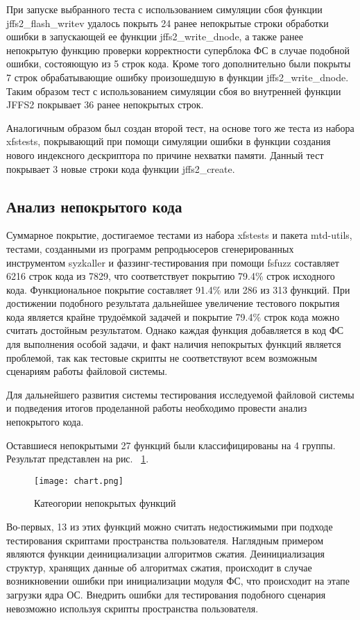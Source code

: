 При запуске выбранного теста с использованием симуляции сбоя функции jffs2\_flash\_writev удалось покрыть 24 ранее непокрытые строки обработки ошибки в запускающей ее функции jffs2\_write\_dnode, а также ранее непокрытую функцию проверки корректности суперблока ФС в случае подобной ошибки, состояющую из 5 строк кода. Кроме того дополнительно были покрыты 7 строк обрабатывающие ошибку произошедшую в функции jffs2\_write\_dnode. Таким образом тест с использованием симуляции сбоя во внутренней функции JFFS2 покрывает 36 ранее непокрытых строк.

Аналогичным образом был создан второй тест, на основе того же теста из набора xfstests, покрывающий при помощи симуляции ошибки в функции создания нового индексного дескриптора по причине нехватки памяти. Данный тест покрывает 3 новые строки кода функции jffs2\_create.

\subsection{Анализ непокрытого кода}

Суммарное покрытие, достигаемое тестами из набора xfstests и пакета mtd-utils, тестами, созданными из программ репродьюсеров сгенерированных инструментом syzkaller и фаззинг-тестирования при помощи fsfuzz составляет 6216 строк кода из 7829, что соответствует покрытию 79.4\% строк исходного кода. Функциональное покрытие составляет 91.4\% или 286 из 313 функций. При достижении подобного результата дальнейшее увеличение тестового покрытия кода является крайне трудоёмкой задачей и покрытие 79.4\% строк кода можно считать достойным результатом. Однако каждая функция добавляется в код ФС для выполнения особой задачи, и факт наличия непокрытых функций является проблемой, так как тестовые скрипты не соответствуют всем возможным сценариям работы файловой системы.

Для дальнейшего развития системы тестирования исследуемой файловой системы и подведения итогов проделанной работы необходимо провести анализ непокрытого кода.

Оставшиеся непокрытыми 27 функций были классифицированы на 4 группы. Результат представлен на рис. ~\ref{funcs}.

\begin{figure}[H]
	\centering
	\texttt{[image: chart.png]}
	\caption{Катеогории непокрытых функций}
	\label{funcs}
\end{figure}

Во-первых, 13 из этих функций можно считать недостижимыми при подходе тестирования скриптами пространства пользователя. Наглядным примером являются функции деинициализации алгоритмов сжатия. Деинициализация структур, хранящих данные об алгоритмах сжатия, происходит в случае возникновении ошибки при инициализации модуля ФС, что происходит на этапе загрузки ядра ОС. Внедрить ошибки для тестирования подобного сценария невозможно используя скрипты пространства пользователя.

